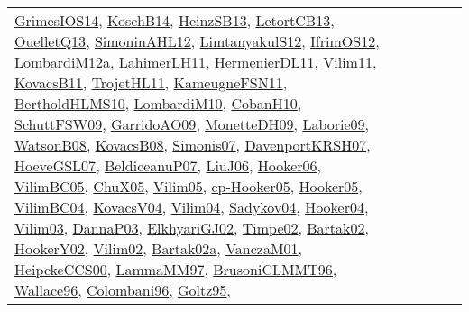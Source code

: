 {\begin{longtable}{lp{3cm}>{\raggedright}p{6cm}>{\raggedright}p{6cm}p{8cm}}
\href{articles/GrimesIOS14.pdf}{GrimesIOS14}\cite{GrimesIOS14}, \href{papers/KoschB14.pdf}{KoschB14}\cite{KoschB14}, \href{articles/HeinzSB13.pdf}{HeinzSB13}\cite{HeinzSB13}, \href{papers/LetortCB13.pdf}{LetortCB13}\cite{LetortCB13}, \href{papers/OuelletQ13.pdf}{OuelletQ13}\cite{OuelletQ13}, \href{papers/SimoninAHL12.pdf}{SimoninAHL12}\cite{SimoninAHL12}, \href{articles/LimtanyakulS12.pdf}{LimtanyakulS12}\cite{LimtanyakulS12}, \href{papers/IfrimOS12.pdf}{IfrimOS12}\cite{IfrimOS12}, \href{articles/LombardiM12a.pdf}{LombardiM12a}\cite{LombardiM12a}, \href{papers/LahimerLH11.pdf}{LahimerLH11}\cite{LahimerLH11}, \href{papers/HermenierDL11.pdf}{HermenierDL11}\cite{HermenierDL11}, \href{papers/Vilim11.pdf}{Vilim11}\cite{Vilim11}, \href{articles/KovacsB11.pdf}{KovacsB11}\cite{KovacsB11}, \href{articles/TrojetHL11.pdf}{TrojetHL11}\cite{TrojetHL11}, \href{papers/KameugneFSN11.pdf}{KameugneFSN11}\cite{KameugneFSN11}, \href{papers/BertholdHLMS10.pdf}{BertholdHLMS10}\cite{BertholdHLMS10}, \href{papers/LombardiM10.pdf}{LombardiM10}\cite{LombardiM10}, \href{papers/CobanH10.pdf}{CobanH10}\cite{CobanH10}, \href{papers/SchuttFSW09.pdf}{SchuttFSW09}\cite{SchuttFSW09}, \href{articles/GarridoAO09.pdf}{GarridoAO09}\cite{GarridoAO09}, \href{papers/MonetteDH09.pdf}{MonetteDH09}\cite{MonetteDH09}, \href{papers/Laborie09.pdf}{Laborie09}\cite{Laborie09}, \href{papers/WatsonB08.pdf}{WatsonB08}\cite{WatsonB08}, \href{articles/KovacsB08.pdf}{KovacsB08}\cite{KovacsB08}, \href{articles/Simonis07.pdf}{Simonis07}\cite{Simonis07}, \href{papers/DavenportKRSH07.pdf}{DavenportKRSH07}\cite{DavenportKRSH07}, \href{papers/HoeveGSL07.pdf}{HoeveGSL07}\cite{HoeveGSL07}, \href{papers/BeldiceanuP07.pdf}{BeldiceanuP07}\cite{BeldiceanuP07}, \href{papers/LiuJ06.pdf}{LiuJ06}\cite{LiuJ06}, \href{articles/Hooker06.pdf}{Hooker06}\cite{Hooker06}, \href{articles/VilimBC05.pdf}{VilimBC05}\cite{VilimBC05}, \href{papers/ChuX05.pdf}{ChuX05}\cite{ChuX05}, \href{papers/Vilim05.pdf}{Vilim05}\cite{Vilim05}, \href{papers/cp-Hooker05.pdf}{cp-Hooker05}\cite{cp-Hooker05}, \href{articles/Hooker05.pdf}{Hooker05}\cite{Hooker05}, \href{papers/VilimBC04.pdf}{VilimBC04}\cite{VilimBC04}, \href{papers/KovacsV04.pdf}{KovacsV04}\cite{KovacsV04}, \href{papers/Vilim04.pdf}{Vilim04}\cite{Vilim04}, \href{papers/Sadykov04.pdf}{Sadykov04}\cite{Sadykov04}, \href{papers/Hooker04.pdf}{Hooker04}\cite{Hooker04}, \href{papers/Vilim03.pdf}{Vilim03}\cite{Vilim03}, \href{papers/DannaP03.pdf}{DannaP03}\cite{DannaP03}, \href{papers/ElkhyariGJ02.pdf}{ElkhyariGJ02}\cite{ElkhyariGJ02}, \href{articles/Timpe02.pdf}{Timpe02}\cite{Timpe02}, \href{papers/Bartak02.pdf}{Bartak02}\cite{Bartak02}, \href{papers/HookerY02.pdf}{HookerY02}\cite{HookerY02}, \href{papers/Vilim02.pdf}{Vilim02}\cite{Vilim02}, \href{papers/Bartak02a.pdf}{Bartak02a}\cite{Bartak02a}, \href{papers/VanczaM01.pdf}{VanczaM01}\cite{VanczaM01}, \href{articles/HeipckeCCS00.pdf}{HeipckeCCS00}\cite{HeipckeCCS00}, \href{articles/LammaMM97.pdf}{LammaMM97}\cite{LammaMM97}, \href{papers/BrusoniCLMMT96.pdf}{BrusoniCLMMT96}\cite{BrusoniCLMMT96}, \href{articles/Wallace96.pdf}{Wallace96}\cite{Wallace96}, \href{papers/Colombani96.pdf}{Colombani96}\cite{Colombani96}, \href{papers/Goltz95.pdf}{Goltz95}\cite{Goltz95}, 
\end{longtable}}
